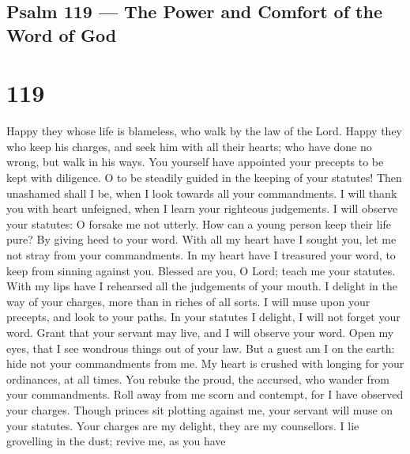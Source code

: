 \hypertarget{psalm-119-the-power-and-comfort-of-the-word-of-god}{%
\subsection{Psalm 119 --- The Power and Comfort of the Word of
God}\label{psalm-119-the-power-and-comfort-of-the-word-of-god}}

\hypertarget{section-118}{%
\section{119}\label{section-118}}

 Happy they whose life is blameless, who walk by the law of
the Lord.  Happy they who keep his charges, and seek him
with all their hearts;  who have done no wrong, but walk in
his ways.  You yourself have appointed your precepts to be
kept with diligence.  O to be steadily guided in the keeping
of your statutes!  Then unashamed shall I be, when I look
towards all your commandments.  I will thank you with heart
unfeigned, when I learn your righteous judgements.  I will
observe your statutes: O forsake me not utterly.  How can a
young person keep their life pure? By giving heed to your word.
 With all my heart have I sought you, let me not stray from
your commandments.  In my heart have I treasured your word,
to keep from sinning against you.  Blessed are you, O Lord;
teach me your statutes.  With my lips have I rehearsed all
the judgements of your mouth.  I delight in the way of your
charges, more than in riches of all sorts.  I will muse
upon your precepts, and look to your paths.  In your
statutes I delight, I will not forget your word.  Grant
that your servant may live, and I will observe your word. 
Open my eyes, that I see wondrous things out of your law. 
But a guest am I on the earth: hide not your commandments from me.
 My heart is crushed with longing for your ordinances, at
all times.  You rebuke the proud, the accursed, who wander
from your commandments.  Roll away from me scorn and
contempt, for I have observed your charges.  Though princes
sit plotting against me, your servant will muse on your statutes.
 Your charges are my delight, they are my counsellors.
 I lie grovelling in the dust; revive me, as you have
